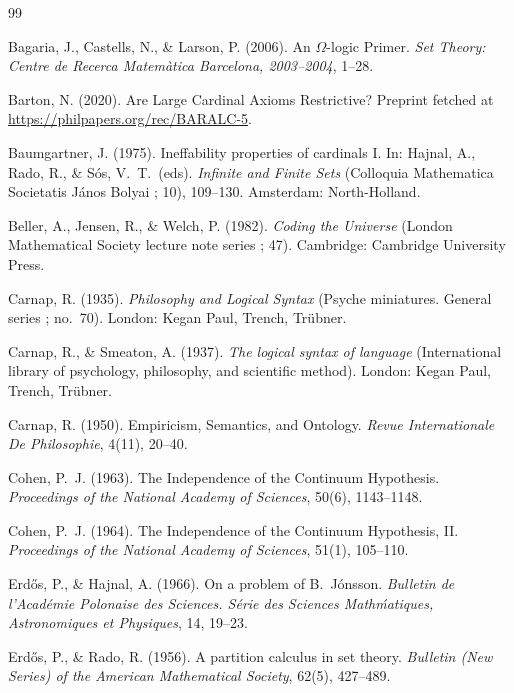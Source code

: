 \documentclass[12pt]{article}
\theoremstyle{plain}
\theoremstyle{definition}
\begin{document}
\begin{thebibliography}{99}

	 Bagaria, J., Castells, N., \& Larson, P. (2006). An $\Omega$-logic Primer. \textit{Set Theory: Centre de Recerca Matem\`atica Barcelona, 2003--2004}, 1--28.

	 Barton, N. (2020). Are Large Cardinal Axioms Restrictive? Preprint fetched at \url{https://philpapers.org/rec/BARALC-5}.

	 Baumgartner, J. (1975). Ineffability properties of cardinals I. In: Hajnal, A., Rado, R., \& S\'os, V.\ T.\ (eds). \textit{Infinite and Finite Sets} (Colloquia Mathematica Societatis
	J\'anos Bolyai ; 10), 109--130. Amsterdam: North-Holland.

	 Beller, A., Jensen, R., \& Welch, P. (1982). \textit{Coding the Universe} (London Mathematical Society lecture note series ; 47). Cambridge: Cambridge University Press.

	 Carnap, R. (1935). \textit{Philosophy and Logical Syntax} (Psyche miniatures. General series ; no.\ 70). London: Kegan Paul, Trench, Tr\"ubner.

	 Carnap, R., \& Smeaton, A. (1937). \textit{The logical syntax of language} (International library of psychology, philosophy, and scientific method). London: Kegan Paul, Trench, Tr\"ubner.

	 Carnap, R. (1950). Empiricism, Semantics, and Ontology. \textit{Revue Internationale De Philosophie}, 4(11), 20--40.

	 Cohen, P.\ J. (1963). The Independence of the Continuum Hypothesis. \textit{Proceedings of the National Academy of Sciences}, 50(6), 1143--1148.

	 Cohen, P.\ J. (1964). The Independence of the Continuum Hypothesis, II. \textit{Proceedings of the National Academy of Sciences}, 51(1), 105--110.

	 Erd\H{o}s, P., \& Hajnal, A. (1966). On a problem of B.\ J\'onsson. \textit{Bulletin de l'Acad\'emie Polonaise
		des Sciences. S\'erie des Sciences Math\'matiques, Astronomiques et Physiques}, 14, 19--23.

	 Erd\H{o}s, P., \& Rado, R. (1956). A partition calculus in set theory. \emph{Bulletin (New Series) of the American Mathematical Society}, 62(5), 427--489.


\end{thebibliography}
\end{document}
